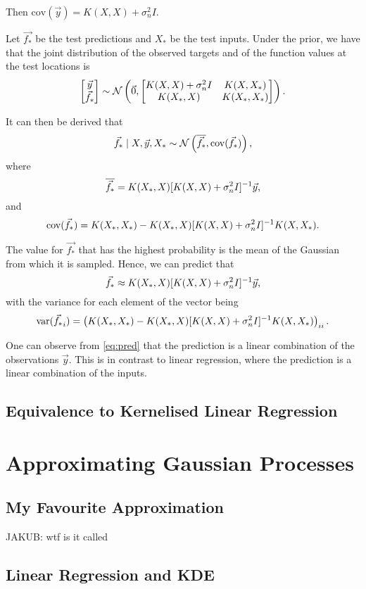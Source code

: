 \documentclass[11pt]{report}
\newcommand\cN{\mathcal{N}}
\newcommand\cov{\mathrm{cov}}
\newcommand\var{\mathrm{var}}
\newcommand\jakub[1]{{\color{red}JAKUB: #1}}
\begin{document}
Then $\cov(\vec{y}) = K(X, X) + \sigma_n^2I$.

Let $\vec{f_*}$ be the test predictions and $X_*$ be the test inputs. Under the prior, we have that the joint distribution of the observed targets and of the function values at the test locations is \[
    \begin{bmatrix}
        \vec{y} \\ \vec{f_*}
    \end{bmatrix} \sim \cN\left(\vec0, \begin{bmatrix}
        K(X, X) + \sigma_n^2I & K(X, X_*) \\
        K(X_*, X) & K(X_*, X_*)
    \end{bmatrix}\right)\text.
\]

It can then be derived that \[
    \vec{f_*} \mid X, \vec{y}, X_* \sim \cN\left(\overline{\vec{f_*}}, \cov(\vec{f_*})\right)\text,
\] where \[
    \overline{\vec{f_*}} = K(X_*, X)[K(X, X) + \sigma_n^2I]^{-1}\vec{y}\text,
\] and \[
    \cov(\vec{f_*}) = K(X_*, X_*) - K(X_*, X)[K(X, X) + \sigma_n^2I]^{-1}K(X, X_*)\text.
\]

The value for $\vec{f_*}$ that has the highest probability is the mean of the Gaussian from which it is sampled. Hence, we can predict that \begin{equation}
    \label{eq:pred}
    \vec{f_*} \approx K(X_*, X)[K(X, X) + \sigma_n^2I]^{-1}\vec{y}\text,
\end{equation} with the variance for each element of the vector being\[
    \var(\vec{f_*}_i) = \left( K(X_*, X_*) - K(X_*, X)[K(X, X) + \sigma_n^2I]^{-1}K(X, X_*) \right)_{ii}\text.
\]

One can observe from \cref{eq:pred} that the prediction is a linear combination of the observations $\vec{y}$. This is in contrast to linear regression, where the prediction is a linear combination of the inputs.

\subsection{Equivalence to Kernelised Linear Regression}

\section{Approximating Gaussian Processes}

\subsection{My Favourite Approximation}

\jakub{wtf is it called}

\subsection{Linear Regression and KDE}
\end{document}
